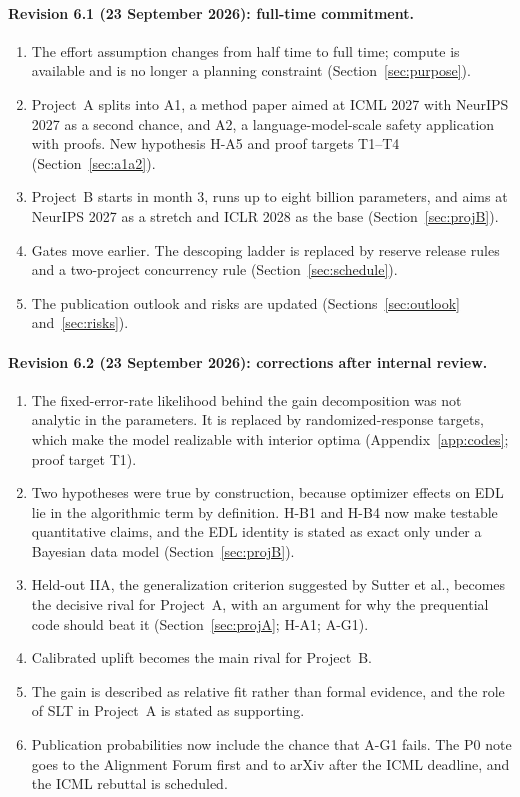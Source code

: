 \documentclass[11pt,a4paper]{article}
\begin{document}
\paragraph{Revision 6.1 (23 September 2026): full-time commitment.}
\begin{enumerate}[leftmargin=*]
\item The effort assumption changes from half time to full time; compute
is available and is no longer a planning constraint
(Section~\ref{sec:purpose}).
\item Project~A splits into A1, a method paper aimed at ICML 2027 with
NeurIPS 2027 as a second chance, and A2, a language-model-scale safety
application with proofs. New hypothesis H-A5 and proof targets T1--T4
(Section~\ref{sec:a1a2}).
\item Project~B starts in month 3, runs up to eight billion parameters, and
aims at NeurIPS 2027 as a stretch and ICLR 2028 as the base
(Section~\ref{sec:projB}).
\item Gates move earlier. The descoping ladder is replaced by reserve
release rules and a two-project concurrency rule
(Section~\ref{sec:schedule}).
\item The publication outlook and risks are updated
(Sections~\ref{sec:outlook} and~\ref{sec:risks}).
\end{enumerate}

\paragraph{Revision 6.2 (23 September 2026): corrections after internal review.}
\begin{enumerate}[leftmargin=*]
\item The fixed-error-rate likelihood behind the gain decomposition was
not analytic in the parameters. It is replaced by randomized-response
targets, which make the model realizable with interior optima
(Appendix~\ref{app:codes}; proof target T1).
\item Two hypotheses were true by construction, because optimizer effects
on EDL lie in the algorithmic term by definition. H-B1 and H-B4 now make
testable quantitative claims, and the EDL identity is stated as exact only
under a Bayesian data model (Section~\ref{sec:projB}).
\item Held-out IIA, the generalization criterion suggested by Sutter et
al., becomes the decisive rival for Project~A, with an argument for why
the prequential code should beat it (Section~\ref{sec:projA}; H-A1; A-G1).
\item Calibrated uplift becomes the main rival for Project~B.
\item The gain is described as relative fit rather than formal evidence,
and the role of SLT in Project~A is stated as supporting.
\item Publication probabilities now include the chance that A-G1 fails.
The P0 note goes to the Alignment Forum first and to arXiv after the ICML
deadline, and the ICML rebuttal is scheduled.
\end{enumerate}
\end{document}
